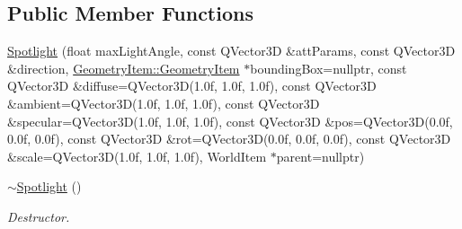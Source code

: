 \subsection*{Public Member Functions}
\begin{DoxyCompactItemize}
\item 
\mbox{\hyperlink{class_geometry_engine_1_1_geometry_world_item_1_1_geometry_light_1_1_spotlight_ad7bc16302cf245e1f71d8c9af23d3a20}{Spotlight}} (float max\+Light\+Angle, const Q\+Vector3D \&att\+Params, const Q\+Vector3D \&direction, \mbox{\hyperlink{class_geometry_engine_1_1_geometry_world_item_1_1_geometry_item_1_1_geometry_item}{Geometry\+Item\+::\+Geometry\+Item}} $\ast$bounding\+Box=nullptr, const Q\+Vector3D \&diffuse=Q\+Vector3D(1.\+0f, 1.\+0f, 1.\+0f), const Q\+Vector3\+D \&ambient=\+Q\+Vector3\+D(1.\+0f, 1.\+0f, 1.\+0f), const Q\+Vector3\+D \&specular=\+Q\+Vector3\+D(1.\+0f, 1.\+0f, 1.\+0f), const Q\+Vector3\+D \&pos=\+Q\+Vector3\+D(0.\+0f, 0.\+0f, 0.\+0f), const Q\+Vector3\+D \&rot=\+Q\+Vector3\+D(0.\+0f, 0.\+0f, 0.\+0f), const Q\+Vector3\+D \&scale=\+Q\+Vector3\+D(1.\+0f, 1.\+0f, 1.\+0f), World\+Item $\ast$parent=nullptr)
\item 
\mbox{\label{class_geometry_engine_1_1_geometry_world_item_1_1_geometry_light_1_1_spotlight_a316a8bfae90cfab961bb11f5242c82af}} 
\mbox{\hyperlink{class_geometry_engine_1_1_geometry_world_item_1_1_geometry_light_1_1_spotlight_a316a8bfae90cfab961bb11f5242c82af}{$\sim$\+Spotlight}} ()
\begin{DoxyCompactList}\small\item\em Destructor. \end{DoxyCompactList}\end{DoxyCompactItemize}
